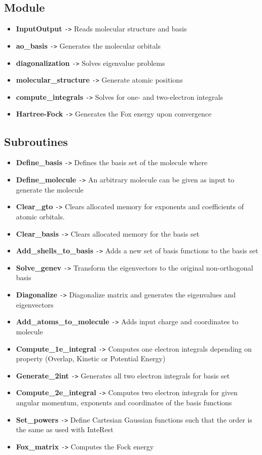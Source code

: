 \documentclass[11pt,a4paper]{article}
\begin{document}
\subsection*{Module}
\begin{itemize}
    \item \textbf{InputOutput} \texttt{->} Reads molecular structure and basis
    \item \textbf{ao\_basis} \texttt{->} Generates the molecular orbitals
    \item \textbf{diagonalization} \texttt{->} Solves eigenvalue problems
    \item \textbf{molecular\_structure} \texttt{->} Generate atomic positions
    \item \textbf{compute\_integrals} \texttt{->} Solves for one- and two-electron integrals
    \item \textbf{Hartree-Fock} \texttt{->} Generates the Fox energy upon convergence
\end{itemize}

\subsection*{Subroutines}
\begin{itemize}
    \item \textbf{Define\_basis} \texttt{->} Defines the basis set of the molecule where
    \item \textbf{Define\_molecule} \texttt{->} An arbitrary molecule can be given as input to generate the molecule
    \item \textbf{Clear\_gto} \texttt{->} Clears allocated memory for exponents and coefficients of atomic orbitals.
    \item \textbf{Clear\_basis} \texttt{->} Clears allocated memory for the basis set
    \item \textbf{Add\_shells\_to\_basis} \texttt{->} Adds a new set of basis functions to the basis set
    \item \textbf{Solve\_genev} \texttt{->} Transform the eigenvectors to the original non-orthogonal basis
    \item \textbf{Diagonalize} \texttt{->} Diagonalize matrix and generates the eigenvalues and eigenvectors
    \item \textbf{Add\_atoms\_to\_molecule} \texttt{->} Adds input charge and coordinates to molecule
    \item \textbf{Compute\_1e\_integral} \texttt{->} Computes one electron integrals depending on property (Overlap, Kinetic or Potential Energy)
    \item \textbf{Generate\_2int} \texttt{->} Generates all two electron integrals for basis set
    \item \textbf{Compute\_2e\_integral} \texttt{->} Computes two electron integrals for given angular momentum, exponents and coordinates of the basis functions
    \item \textbf{Set\_powers} \texttt{->} Define Cartesian Gaussian functions such that the order is the same as used with InteRest
    \item \textbf{Fox\_matrix} \texttt{->} Computes the Fock energy 

\end{itemize}
\end{document}
